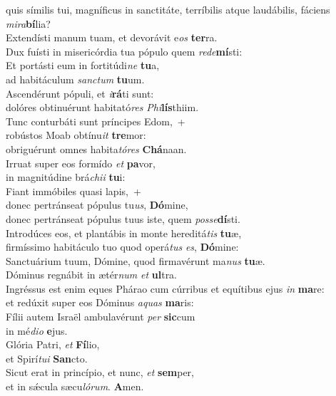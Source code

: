 \evenverse quis símilis tui, magníficus in sanctitáte, terríbilis atque laudábilis, fáciens \textit{mi}\textit{ra}\textbf{bí}lia?\\
\oddverse Extendísti manum tuam, et devorávit e\textit{os} \textbf{ter}ra.~\*\\
\oddverse Dux fuísti in misericórdia tua pópulo quem \textit{re}\textit{de}\textbf{mí}sti:\\
\evenverse Et portásti eum in fortitúdi\textit{ne} \textbf{tu}a,~\*\\
\evenverse ad habitáculum \textit{san}\textit{ctum} \textbf{tu}um.\\
\oddverse Ascendérunt pópuli, et \textit{i}\textbf{rá}ti sunt:~\*\\
\oddverse dolóres obtinuérunt habitató\textit{res} \textit{Phi}\textbf{lís}thiim.\\
\evenverse Tunc conturbáti sunt príncipes Edom,~+\\
\evenverse  robústos Moab obtínu\textit{it} \textbf{tre}mor:~\*\\
\evenverse obriguérunt omnes habita\textit{tó}\textit{res} \textbf{Chá}naan.\\
\oddverse Irruat super eos formído \textit{et} \textbf{pa}vor,~\*\\
\oddverse in magnitúdine brá\textit{chi}\textit{i} \textbf{tu}i:\\
\evenverse Fiant immóbiles quasi lapis,~+\\
\evenverse  donec pertránseat pópulus tu\textit{us}, \textbf{Dó}mine,~\*\\
\evenverse donec pertránseat pópulus tuus iste, quem \textit{pos}\textit{se}\textbf{dí}sti.\\
\oddverse Introdúces eos, et plantábis in monte hereditá\textit{tis} \textbf{tu}æ,~\*\\
\oddverse firmíssimo habitáculo tuo quod operá\textit{tus} \textit{es}, \textbf{Dó}mine:\\
\evenverse Sanctuárium tuum, Dómine, quod firmavérunt ma\textit{nus} \textbf{tu}æ.~\*\\
\evenverse Dóminus regnábit in ætér\textit{num} \textit{et} \textbf{ul}tra.\\
\oddverse Ingréssus est enim eques Phárao cum cúrribus et equítibus ejus \textit{in} \textbf{ma}re:~\*\\
\oddverse et redúxit super eos Dóminus \textit{a}\textit{quas} \textbf{ma}ris:\\
\evenverse Fílii autem Israël ambulavérunt \textit{per} \textbf{sic}cum~\*\\
\evenverse in mé\textit{di}\textit{o} \textbf{e}jus.\\
\oddverse Glória Patri, \textit{et} \textbf{Fí}lio,~\*\\
\oddverse et Spirí\textit{tu}\textit{i} \textbf{San}cto.\\
\evenverse Sicut erat in princípio, et nunc, \textit{et} \textbf{sem}per,~\*\\
\evenverse et in sǽcula sæcu\textit{ló}\textit{rum}. \textbf{A}men.\\
